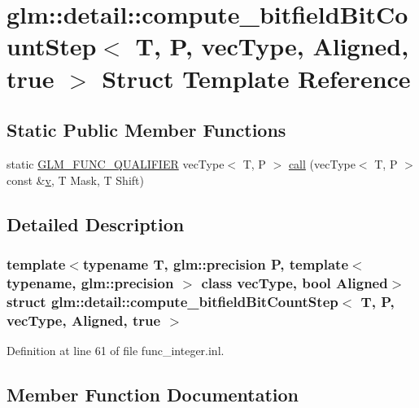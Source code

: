 \hypertarget{structglm_1_1detail_1_1compute__bitfield_bit_count_step_3_01_t_00_01_p_00_01vec_type_00_01_aligned_00_01true_01_4}{}\section{glm\+::detail\+::compute\+\_\+bitfield\+Bit\+Count\+Step$<$ T, P, vec\+Type, Aligned, true $>$ Struct Template Reference}
\label{structglm_1_1detail_1_1compute__bitfield_bit_count_step_3_01_t_00_01_p_00_01vec_type_00_01_aligned_00_01true_01_4}
\subsection*{Static Public Member Functions}
\begin{DoxyCompactItemize}
\item 
static \mbox{\hyperlink{setup_8hpp_a33fdea6f91c5f834105f7415e2a64407}{G\+L\+M\+\_\+\+F\+U\+N\+C\+\_\+\+Q\+U\+A\+L\+I\+F\+I\+ER}} vec\+Type$<$ T, P $>$ \mbox{\hyperlink{structglm_1_1detail_1_1compute__bitfield_bit_count_step_3_01_t_00_01_p_00_01vec_type_00_01_aligned_00_01true_01_4_a3c7641484a1e6fe29f0074b29591b0c2}{call}} (vec\+Type$<$ T, P $>$ const \&\mbox{\hyperlink{glad_8h_a14cfbe2fc2234f5504618905b69d1e06}{v}}, T Mask, T Shift)
\end{DoxyCompactItemize}


\subsection{Detailed Description}
\subsubsection*{template$<$typename T, glm\+::precision P, template$<$ typename, glm\+::precision $>$ class vec\+Type, bool Aligned$>$\newline
struct glm\+::detail\+::compute\+\_\+bitfield\+Bit\+Count\+Step$<$ T, P, vec\+Type, Aligned, true $>$}



Definition at line 61 of file func\+\_\+integer.\+inl.



\subsection{Member Function Documentation}
\mbox{\label{structglm_1_1detail_1_1compute__bitfield_bit_count_step_3_01_t_00_01_p_00_01vec_type_00_01_aligned_00_01true_01_4_a3c7641484a1e6fe29f0074b29591b0c2}} 
